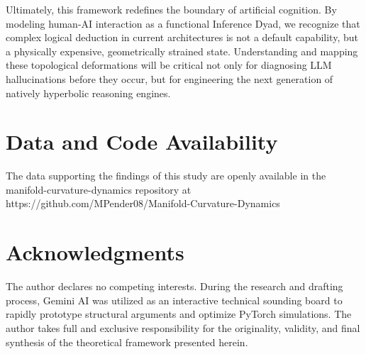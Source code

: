 \documentclass[11pt, a4paper]{article}
\begin{document}
Ultimately, this framework redefines the boundary of artificial cognition. By modeling human-AI interaction as a functional Inference Dyad, we recognize that complex logical deduction in current architectures is not a default capability, but a physically expensive, geometrically strained state. Understanding and mapping these topological deformations will be critical not only for diagnosing LLM hallucinations before they occur, but for engineering the next generation of natively hyperbolic reasoning engines.

\section{Data and Code Availability}
The data supporting the findings of this study are openly available in the manifold-curvature-dynamics repository at https://github.com/MPender08/Manifold-Curvature-Dynamics

\section{Acknowledgments} The author declares no competing interests. During the research and drafting process, Gemini AI was utilized as an interactive technical sounding board to rapidly prototype structural arguments and optimize PyTorch simulations. The author takes full and exclusive responsibility for the originality, validity, and final synthesis of the theoretical framework presented herein.



 
\end{document}
